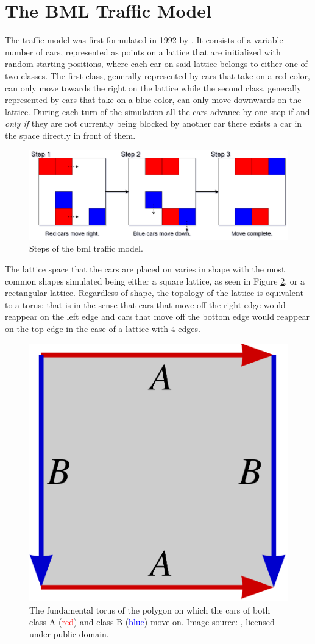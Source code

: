\section{The BML Traffic Model}
\label{sec:The-BML-Traffic-Model}
The  traffic model was first formulated in 1992 by \citet{Biham}. It consists of a variable number of cars, represented as points on a lattice that are initialized with random starting positions, where each car on said lattice belongs to either one of two classes. The first class, generally represented by cars that take on a red color, can only move towards the right on the lattice while the second class, generally represented by cars that take on a blue color, can only move downwards on the lattice. During each turn of the simulation all the cars advance by one step if and \textit{only if} they are not currently being blocked by another car \ie there exists a car  in the space directly in front of them.

\begin{figure}[htb!]
    \centering
    \includegraphics[width=\linewidth]{Images/Section 2/BML Step.png}
    \caption{Steps of the \gls{bml} traffic model.}
    \label{fig:BML-Step}
\end{figure}

\noindent The lattice space that the cars are placed on varies in shape with the most common shapes simulated being either a square lattice, as seen in Figure \ref{fig:BML-Torus}, or a rectangular lattice. Regardless of shape, the topology of the lattice is equivalent to a torus; that is in the sense that cars that move off the right edge would reappear on the left edge and cars that move off the bottom edge would reappear on the top edge in the case of a lattice with 4 edges.

\begin{figure}[htb!]
    \centering
    \includegraphics[width=0.25\linewidth]{Images/Section 2/BML Torus.png}
    \caption{The fundamental torus of the polygon on which the cars of both class A (\textcolor{red}{red}) and class B (\textcolor{blue}{blue}) move on. Image source: \cite{Wikipedia_Torus}, licensed under public domain.}
    \label{fig:BML-Torus}
\end{figure}

